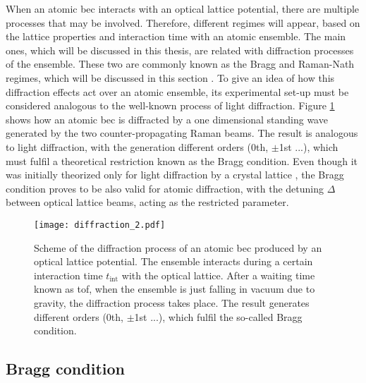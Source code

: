 When an atomic \ac{bec} interacts with an optical lattice potential, there are multiple processes that may be involved. Therefore, different regimes will appear, based on the lattice properties and interaction time with an atomic ensemble. The main ones, which will be discussed in this thesis, are related with diffraction processes of the ensemble. These two are commonly known as the Bragg and Raman-Nath regimes, which will be discussed in this section \cite{Mueller2008,Ovchinnikov1999}. To give an idea of how this diffraction effects act over an atomic ensemble, its experimental set-up must be considered analogous to the well-known process of light diffraction. Figure \ref{fig:diffraction} shows how an atomic \ac{bec} is diffracted by a one dimensional standing wave generated by the two counter-propagating Raman beams. The result is analogous to light diffraction, with the generation different orders (0th, $\pm$1st ...), which must fulfil a theoretical restriction known as the Bragg condition. Even though it was initially theorized only for light diffraction by a crystal lattice \cite{Bragg1913}, the Bragg condition proves to be also valid for atomic diffraction, with the detuning $\Delta$ between optical lattice beams, acting as the restricted parameter.


\begin{figure}[!htbp]\centering
	\texttt{[image: diffraction\_2.pdf]}
	\caption[Scheme of the diffraction process of an atomic \ac{bec} produced by an optical lattice potential]{Scheme of the diffraction process of an atomic \ac{bec} produced by an optical lattice potential. The ensemble interacts during a certain interaction time $t_{\text{int}}$ with the optical lattice. After a waiting time known as \Acf{tof}, when the ensemble is just falling in vacuum due to gravity, the diffraction process takes place. The result generates different orders (0th, $\pm$1st ...), which fulfil the so-called Bragg condition.}\label{fig:diffraction}
\end{figure}


\subsection{Bragg condition}\label{subsec:Bragg_condition}

